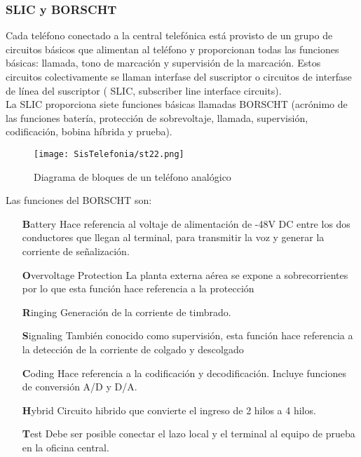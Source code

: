 \documentclass[11pt,fleqn]{book} %
\begin{document}
\subsubsection{SLIC y BORSCHT}
Cada teléfono conectado a la central telefónica está provisto de un grupo de circuitos básicos que alimentan al teléfono y proporcionan todas las funciones básicas: llamada, tono de marcación y supervisión de la marcación. Estos circuitos colectivamente se llaman interfase del suscriptor o circuitos de interfase de línea del suscriptor ( SLIC, subscriber line interface circuits).\\
La SLIC proporciona siete funciones básicas llamadas BORSCHT (acrónimo de las funciones batería, protección de sobrevoltaje, llamada, supervisión, codificación, bobina híbrida y prueba).
\begin{figure}[ht]
\centering\texttt{[image: SisTelefonia/st22.png]}
\caption{Diagrama de bloques de un teléfono analógico}
\label{fig:Diagrama de bloques de un teléfono analógico}
\end{figure}
Las funciones del BORSCHT son:
\begin{itemize}
\item[\textbf{B}attery] Hace referencia al voltaje de alimentación de -48V DC entre los dos conductores que llegan al terminal, para transmitir la  voz y generar la corriente de señalización.
\item[\textbf{O}vervoltage Protection] La planta externa aérea se expone a sobrecorrientes por lo que esta función hace referencia a la protección 
\item[\textbf{R}inging] Generación de la corriente de timbrado. 
\item[\textbf{S}ignaling] También conocido como supervisión, esta función hace referencia a la detección de la corriente de colgado y descolgado
\item[\textbf{C}oding] Hace referencia a la codificación y decodificación. Incluye funciones de conversión A/D y D/A. 
\item[\textbf{H}ybrid] Circuito hibrido que convierte el ingreso de 2 hilos a 4 hilos.
\item[\textbf{T}est] Debe ser posible conectar el lazo local y el terminal al equipo de prueba en la oficina central. 
\end{itemize}
\end{document}
